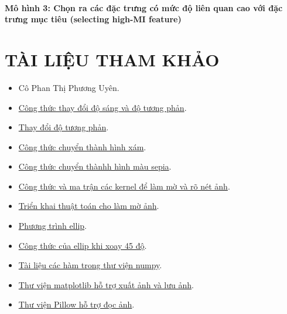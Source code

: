 \documentclass{report}
\begin{document}
    \paragraph{Mô hình 3: Chọn ra các đặc trưng có mức độ liên quan cao với đặc trưng mục tiêu (selecting high-MI feature)}\label{sec:selecting-MI-feature}
    \newpage
\section{TÀI LIỆU THAM KHẢO}
\begin{itemize}
    \item Cô Phan Thị Phương Uyên.
    \item 
    \href{https://ie.nitk.ac.in/blog/2020/01/19/algorithms-for-adjusting-brightness-and-contrast-of-an-image/}{Công thức thay đổi độ sáng và độ tương phản}.

    \item
    \href{https://www.dfstudios.co.uk/articles/programming/image-programming-algorithms/image-processing-algorithms-part-5-contrast-adjustment/}{Thay đổi độ tương phản}.

    \item 
    \href{https://www.baeldung.com/cs/convert-rgb-to-grayscale}{Công thức chuyển thành hình xám}.

    \item 
    \href{https://dyclassroom.com/image-processing-project/how-to-convert-a-color-image-into-sepia-image}{Công thức chuyển thànhh hình màu sepia}.

    \item \href{https://en.wikipedia.org/wiki/Kernel_(image_processing)}{Công thức và ma trận các kernel để làm mờ và rõ nét ảnh}.

    \item 
    \href{https://www.youtube.com/watch?v=4Eh0y3LHTNU&t=658s}{Triển khai thuật toán cho làm mờ ảnh}.
    \item \href{https://www.maa.org/external_archive/joma/Volume8/Kalman/General.html}{Phương trình ellip}.

    \item \href{https://math.stackexchange.com/questions/2003517/how-to-calculate-width-and-height-of-a-45-rotated-ellipse-bounded-by-a-square}{Công thức của ellip khi xoay 45 độ}.

    \item \href{https://numpy.org/doc/stable/user/index.html#user}{Tài liệu các hàm trong thư viện numpy}.

    \item \href{https://matplotlib.org/stable/api/_as_gen/matplotlib.pyplot.imshow.html}{Thư viện matplotlib hỗ trợ xuất ảnh và lưu ảnh}.

    \item \href{https://pillow.readthedocs.io/en/stable/reference/Image.html}{Thư viện Pillow hỗ trợ đọc ảnh}.
    
\end{itemize}
\end{document}
